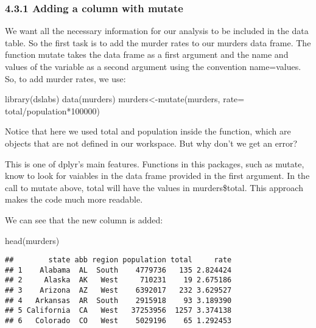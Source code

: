 \documentclass[
]{article}
\newenvironment{Shaded}{\begin{snugshade}}{\end{snugshade}}
\newcommand{\AttributeTok}[1]{\textcolor[rgb]{0.77,0.63,0.00}{#1}}
\newcommand{\DecValTok}[1]{\textcolor[rgb]{0.00,0.00,0.81}{#1}}
\newcommand{\FunctionTok}[1]{\textcolor[rgb]{0.00,0.00,0.00}{#1}}
\newcommand{\NormalTok}[1]{#1}
\newcommand{\OtherTok}[1]{\textcolor[rgb]{0.56,0.35,0.01}{#1}}
\newcommand{\SpecialCharTok}[1]{\textcolor[rgb]{0.00,0.00,0.00}{#1}}
\begin{document}
\hypertarget{adding-a-column-with-mutate}{%
\subsubsection{4.3.1 Adding a column with
mutate}\label{adding-a-column-with-mutate}}

We want all the necessary information for our analysis to be included in
the data table. So the first task is to add the murder rates to our
murders data frame. The function mutate takes the data frame as a first
argument and the name and values of the variable as a second argument
using the convention name=values. So, to add murder rates, we use:

\begin{Shaded}
\begin{Highlighting}[]
\FunctionTok{library}\NormalTok{(dslabs)}
\FunctionTok{data}\NormalTok{(murders)}
\NormalTok{murders}\OtherTok{\textless{}{-}}\FunctionTok{mutate}\NormalTok{(murders, }\AttributeTok{rate=}\NormalTok{ total}\SpecialCharTok{/}\NormalTok{population}\SpecialCharTok{*}\DecValTok{100000}\NormalTok{)}
\end{Highlighting}
\end{Shaded}

Notice that here we used total and population inside the function, which
are objects that are not defined in our workspace. But why don't we get
an error?

This is one of dplyr's main features. Functions in this packages, such
as mutate, know to look for vaiables in the data frame provided in the
first argument. In the call to mutate above, total will have the values
in murders\$total. This approach makes the code much more readable.

We can see that the new column is added:

\begin{Shaded}
\begin{Highlighting}[]
\FunctionTok{head}\NormalTok{(murders)}
\end{Highlighting}
\end{Shaded}

\begin{verbatim}
##        state abb region population total     rate
## 1    Alabama  AL  South    4779736   135 2.824424
## 2     Alaska  AK   West     710231    19 2.675186
## 3    Arizona  AZ   West    6392017   232 3.629527
## 4   Arkansas  AR  South    2915918    93 3.189390
## 5 California  CA   West   37253956  1257 3.374138
## 6   Colorado  CO   West    5029196    65 1.292453
\end{verbatim}
\end{document}
